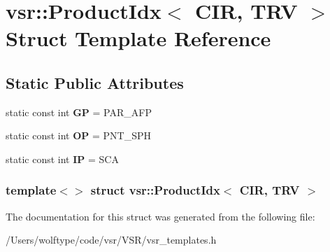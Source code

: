 \hypertarget{structvsr_1_1_product_idx_3_01_c_i_r_00_01_t_r_v_01_4}{\section{vsr\-:\-:Product\-Idx$<$ C\-I\-R, T\-R\-V $>$ Struct Template Reference}
\label{structvsr_1_1_product_idx_3_01_c_i_r_00_01_t_r_v_01_4}
}
\subsection*{Static Public Attributes}
\begin{DoxyCompactItemize}
\item 
\hypertarget{structvsr_1_1_product_idx_3_01_c_i_r_00_01_t_r_v_01_4_addafadac872b55716391b481d646abed}{static const int {\bfseries G\-P} = P\-A\-R\-\_\-\-A\-F\-P}\label{structvsr_1_1_product_idx_3_01_c_i_r_00_01_t_r_v_01_4_addafadac872b55716391b481d646abed}

\item 
\hypertarget{structvsr_1_1_product_idx_3_01_c_i_r_00_01_t_r_v_01_4_a68d4c7578ccb267629a6369d5f30b8a0}{static const int {\bfseries O\-P} = P\-N\-T\-\_\-\-S\-P\-H}\label{structvsr_1_1_product_idx_3_01_c_i_r_00_01_t_r_v_01_4_a68d4c7578ccb267629a6369d5f30b8a0}

\item 
\hypertarget{structvsr_1_1_product_idx_3_01_c_i_r_00_01_t_r_v_01_4_a8d83f45e52ab1a74f618d9905029536b}{static const int {\bfseries I\-P} = S\-C\-A}\label{structvsr_1_1_product_idx_3_01_c_i_r_00_01_t_r_v_01_4_a8d83f45e52ab1a74f618d9905029536b}

\end{DoxyCompactItemize}
\subsubsection*{template$<$$>$ struct vsr\-::\-Product\-Idx$<$ C\-I\-R, T\-R\-V $>$}



The documentation for this struct was generated from the following file\-:\begin{DoxyCompactItemize}
\item 
/\-Users/wolftype/code/vsr/\-V\-S\-R/vsr\-\_\-templates.\-h\end{DoxyCompactItemize}
